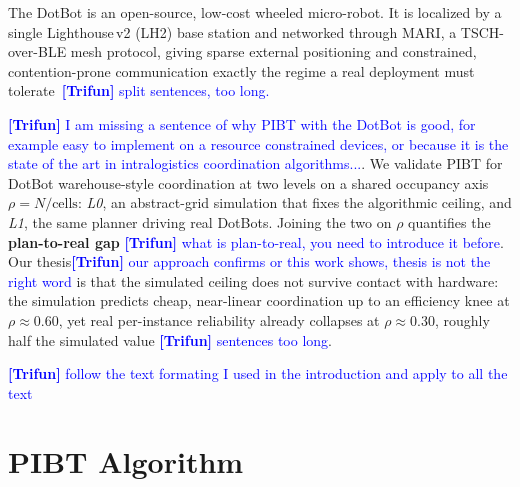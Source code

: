 \documentclass[sigconf, 9pt, nonacm]{acmart}
\newcommand*{\trifun}[1]        {\textcolor{blue}{\textbf{[Trifun]} #1}}
\begin{document}
The DotBot is an open-source, 
    low-cost wheeled micro-robot. 
It is localized by a single Lighthouse\,v2 (LH2) base station and networked through MARI, 
    a TSCH-over-BLE mesh protocol, 
    giving sparse external positioning and constrained, contention-prone communication  exactly the regime a real deployment must tolerate~\cite{alvarado24dotbot}\trifun{split sentences, too long.}

\trifun{I am missing a sentence of why PIBT with the DotBot is good, for example easy to implement on a resource constrained devices, or because it is the state of the art in intralogistics coordination algorithms...}.
We validate PIBT for DotBot warehouse-style coordination at two levels on a shared occupancy axis $\rho = N/\text{cells}$: \emph{L0}, 
    an abstract-grid simulation that fixes the algorithmic ceiling, 
    and \emph{L1}, 
    the same planner driving real DotBots.
Joining the two on $\rho$ quantifies the \textbf{plan-to-real gap} \trifun{what is plan-to-real, you need to introduce it before}.
Our thesis\trifun{our approach confirms or this work shows, thesis is not the right word} is that the simulated ceiling does not survive contact with hardware: the simulation predicts cheap, 
    near-linear coordination up to an efficiency knee at $\rho \approx 0.60$, 
    yet real per-instance reliability already collapses at $\rho \approx 0.30$, 
    roughly half the simulated value \trifun{sentences too long}.

\trifun{follow the text formating I used in the introduction and apply to all the text}
\section{PIBT Algorithm}
\label{sec:pbit}
\end{document}
